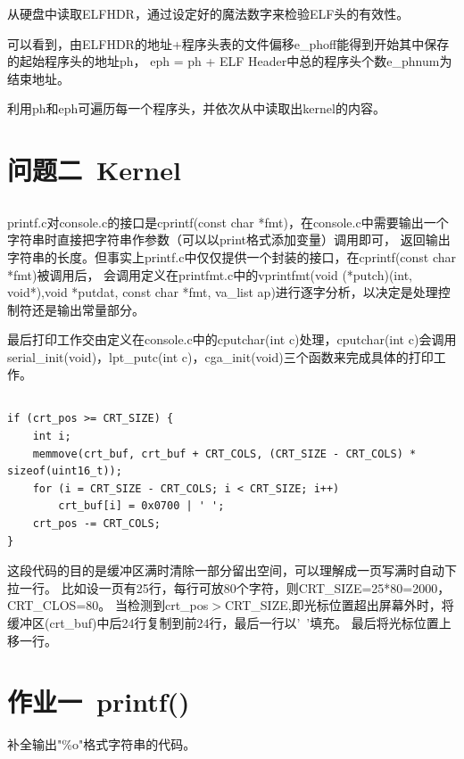 \documentclass[12pt,a4paper,UTF8]{article}
\begin{document}
	从硬盘中读取ELFHDR，通过设定好的魔法数字来检验ELF头的有效性。

	可以看到，由ELFHDR的地址+程序头表的文件偏移e\_phoff能得到开始其中保存的起始程序头的地址ph，
	eph = ph + ELF Header中总的程序头个数e\_phnum为结束地址。

	利用ph和eph可遍历每一个程序头，并依次从中读取出kernel的内容。


\section{问题二\ Kernel}

	\subsection{}
	printf.c对console.c的接口是cprintf(const char *fmt)，在console.c中需要输出一个字符串时直接把字符串作参数（可以以print格式添加变量）调用即可，
	返回输出字符串的长度。但事实上printf.c中仅仅提供一个封装的接口，在cprintf(const char *fmt)被调用后，
	会调用定义在printfmt.c中的vprintfmt(void (*putch)(int, void*),void *putdat, const char *fmt, va\_list ap)进行逐字分析，以决定是处理控制符还是输出常量部分。

	最后打印工作交由定义在console.c中的cputchar(int c)处理，cputchar(int c)会调用serial\_init(void)，lpt\_putc(int c)，cga\_init(void)三个函数来完成具体的打印工作。

	\subsection{}
	\begin{lstlisting}[style=CPP]
if (crt_pos >= CRT_SIZE) {
	int i;
	memmove(crt_buf, crt_buf + CRT_COLS, (CRT_SIZE - CRT_COLS) * sizeof(uint16_t));
	for (i = CRT_SIZE - CRT_COLS; i < CRT_SIZE; i++)
		crt_buf[i] = 0x0700 | ' ';
	crt_pos -= CRT_COLS;
}
	\end{lstlisting}

	这段代码的目的是缓冲区满时清除一部分留出空间，可以理解成一页写满时自动下拉一行。
	比如设一页有25行，每行可放80个字符，则CRT\_SIZE=25*80=2000，CRT\_CLOS=80。
	当检测到crt\_pos$>$CRT\_SIZE,即光标位置超出屏幕外时，将缓冲区(crt\_buf)中后24行复制到前24行，最后一行以'\ '填充。
	最后将光标位置上移一行。

\section{作业一\ printf()}

补全输出"\%o"格式字符串的代码。
\end{document}
